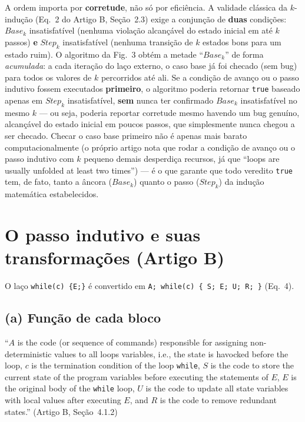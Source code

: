 \documentclass[12pt,a4paper]{article}
\newcommand{\vv}[1]{\texttt{#1}}
\begin{document}
\begin{tcolorbox}[notabox]
A ordem importa por \textbf{corretude}, n\~ao s\'o por efici\^encia. A validade cl\'assica da
$k$-indu\c{c}\~ao (Eq.~2 do Artigo B, Se\c{c}\~ao~2.3) exige a conjun\c{c}\~ao de \textbf{duas}
condi\c{c}\~oes: $Base_k$ insatisfat\'ivel (nenhuma viola\c{c}\~ao alcan\c{c}\'avel do estado
inicial em at\'e $k$ passos) \textbf{e} $Step_k$ insatisfat\'ivel (nenhuma transi\c{c}\~ao de
$k$ estados bons para um estado ruim). O algoritmo da Fig.~3 obt\'em a metade ``$Base_k$'' de
forma \emph{acumulada}: a cada itera\c{c}\~ao do la\c{c}o externo, o caso base j\'a foi
checado (sem bug) para todos os valores de $k$ percorridos at\'e ali. Se a condi\c{c}\~ao de
avan\c{c}o ou o passo indutivo fossem executados \textbf{primeiro}, o algoritmo poderia
retornar \vv{true} baseado apenas em $Step_k$ insatisfat\'ivel, \textbf{sem} nunca ter
confirmado $Base_k$ insatisfat\'ivel no mesmo $k$ --- ou seja, poderia reportar corretude
mesmo havendo um bug genu\'ino, alcan\c{c}\'avel do estado inicial em poucos passos, que
simplesmente nunca chegou a ser checado. Checar o caso base primeiro n\~ao \'e apenas mais
barato computacionalmente (o pr\'oprio artigo nota que rodar a condi\c{c}\~ao de avan\c{c}o ou
o passo indutivo com $k$ pequeno demais desperdi\c{c}a recursos, j\'a que ``loops are usually
unfolded at least two times'') --- \'e o que garante que todo veredito \vv{true} tem, de fato,
tanto a \^ancora ($Base_k$) quanto o passo ($Step_k$) da indu\c{c}\~ao matem\'atica estabelecidos.
\end{tcolorbox}

\newpage

\section{O passo indutivo e suas transformações (Artigo B)}

O la\c{c}o \vv{while(c) \{E;\}} \'e convertido em \vv{A; while(c) \{ S; E; U; R; \}} (Eq.~4).

\subsection{(a) Função de cada bloco}

\begin{tcolorbox}[quotebox]
``$A$ is the code (or sequence of commands) responsible for assigning non-deterministic values
to all loops variables, i.e., the state is havocked before the loop, $c$ is the termination
condition of the loop \texttt{while}, $S$ is the code to store the current state of the
program variables before executing the statements of $E$, $E$ is the original body of the
\texttt{while} loop, $U$ is the code to update all state variables with local values after
executing $E$, and $R$ is the code to remove redundant states.'' (Artigo B, Se\c{c}\~ao~4.1.2)
\end{tcolorbox}
\end{document}
